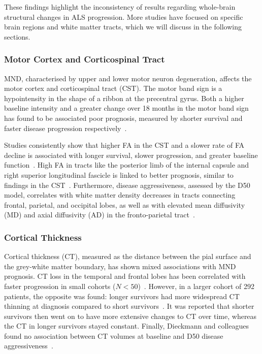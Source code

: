 These findings highlight the inconsistency of results regarding whole-brain structural changes in ALS progression.
More studies have focused on specific brain regions and white matter tracts, which we will discuss in the following sections.

\subsubsection*{Motor Cortex and Corticospinal Tract}
MND, characterised by upper and lower motor neuron degeneration, affects the motor cortex and corticospinal tract (CST).
The motor band sign is a hypointensity in the shape of a ribbon at the precentral gyrus.
Both a higher baseline intensity and a greater change over 18 months in the motor band sign has found to be associated poor prognosis, measured by shorter survival and faster disease progression respectively~\cite{rizzoDiagnosticPrognosticValue2020,bollHypointensityMotorCortex2019}.

Studies consistently show that higher FA in the CST and a slower rate of FA decline is associated with longer survival, slower progression, and greater baseline function~\cite{mullerLargescaleMulticentreCerebral2016, liBrainstemInvolvementAmyotrophic2021, agostaMRIPredictorsLongterm2010, menkeWidespreadGreyMatter2014, kalraProspectiveHarmonizedMulticenter2020}.
High FA in tracts like the posterior limb of the internal capsule and right superior longitudinal fascicle is linked to better prognosis, similar to findings in the CST~\cite{grolezMRICervicalSpinal2018,menkeWidespreadGreyMatter2014}.
Furthermore, disease aggressiveness, assessed by the D50 model, correlates with white matter density decreases in tracts connecting frontal, parietal, and occipital lobes, as well as with elevated mean diffusivity (MD) and axial diffusivity (AD) in the fronto-parietal tract~\cite{steinbachDiseaseAggressivenessSignatures2021}.

\subsubsection*{Cortical Thickness}
Cortical thickness (CT), measured as the distance between the pial surface and the grey-white matter boundary, has shown mixed associations with MND prognosis.
CT loss in the temporal and frontal lobes has been correlated with faster progression in small cohorts ($N<50$)~\cite{dambrosioFrontotemporalCorticalThinning2014, verstraeteStructuralMRIReveals2012}.
However, in a larger cohort of 292 patients, the opposite was found: longer survivors had more widespread CT thinning at diagnosis compared to short survivors~\cite{burghMultimodalLongitudinalStudy2020}.
It was reported that shorter survivors then went on to have more extensive changes to CT over time, whereas the CT in longer survivors stayed constant.
Finally, Dieckmann and colleagues found no association between CT volumes at baseline and D50 disease aggressiveness~\cite{dieckmannCorticalSubcorticalGrey2022}.

